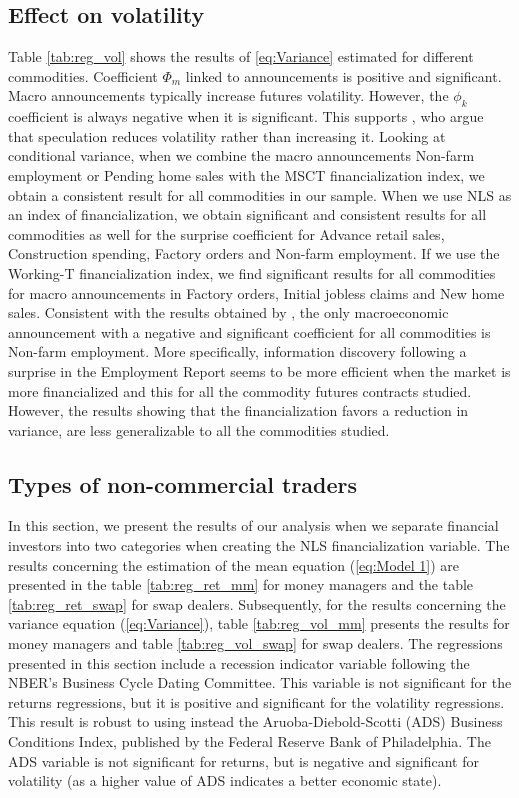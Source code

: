 \documentclass[12pt]{article}
\begin{document}
	\subsection{Effect on volatility}
	Table \ref{tab:reg_vol} shows the results of \eqref{eq:Variance} estimated for different commodities.   Coefficient $\Phi_m$ linked to announcements is positive and significant.  Macro announcements typically increase futures volatility. However, the $\phi_k$ coefficient  is always negative when it is significant. This supports \citet{brunetti2016speculators}, who argue that speculation reduces volatility rather than increasing it. Looking at conditional variance, when we combine the macro  announcements Non-farm employment or Pending home sales with the MSCT financialization index, we obtain a consistent result for all commodities in our sample. When we use NLS as an index of financialization, we obtain significant and consistent results for all commodities as well for the surprise coefficient for Advance retail sales, Construction spending, Factory orders and Non-farm employment.
If we use the Working-T financialization index, we find significant results for all commodities for macro announcements in Factory orders, Initial jobless claims and New home sales. Consistent with the results obtained by \citet{hordahl2015expectations}, the only macroeconomic announcement with a negative and significant coefficient for all commodities is Non-farm employment. More specifically, information discovery following a surprise in the Employment Report seems to be more efficient when the market is more financialized and this for all the commodity futures contracts studied. However, the results showing that the financialization favors a reduction in variance, are less generalizable to all the commodities studied.

\subsection{Types of non-commercial traders}

 In this section, we present the results of our analysis when we separate financial investors into two categories when creating the NLS financialization variable. The results concerning the estimation of the mean equation (\ref{eq:Model 1}) are presented in the table \ref{tab:reg_ret_mm} for money managers and the table \ref{tab:reg_ret_swap} for swap dealers.  Subsequently, for the results concerning the variance equation (\ref{eq:Variance}), table \ref{tab:reg_vol_mm} presents the results for money managers and table \ref{tab:reg_vol_swap} for swap dealers.
The regressions presented in this section include a recession indicator variable following the NBER's Business Cycle Dating Committee. This variable is not significant for the returns regressions, but it is positive and significant for the volatility regressions. This result is robust to using instead the Aruoba-Diebold-Scotti (ADS) Business Conditions Index, published by the Federal Reserve Bank of Philadelphia. The ADS variable is not significant for returns, but is negative and significant for volatility (as a higher value of ADS indicates a better economic state).
\end{document}

